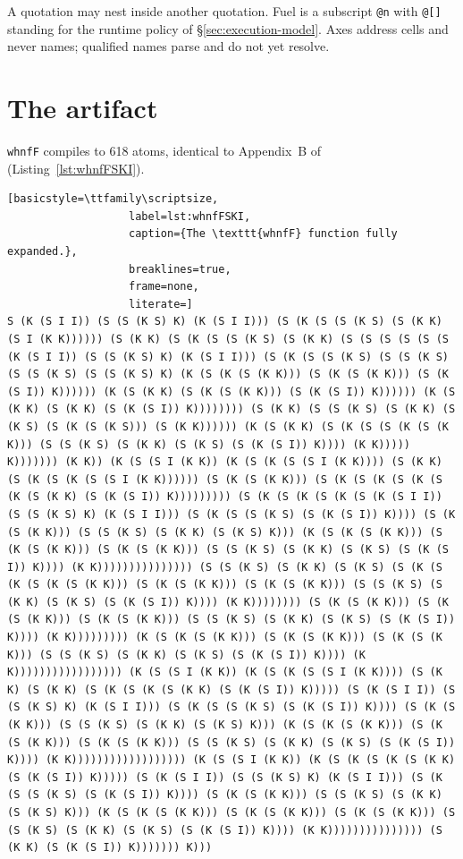 \documentclass[english,submission,code=tt]{programming}
\begin{document}
\newpage
A quotation may nest inside another quotation.  Fuel is a
subscript \texttt{@n} with \texttt{@[]} standing for the runtime policy 
of \S\ref{sec:execution-model}.  Axes address cells and never names;
qualified names parse and do not yet resolve.

\section{The artifact}\label{app:artifact}

\texttt{whnfF} compiles to 618 atoms, identical to 
Appendix~B of \citet{Davis2027} (Listing~\ref{lst:whnfFSKI}).

\begin{lstlisting}[basicstyle=\ttfamily\scriptsize,
                   label=lst:whnfFSKI,
                   caption={The \texttt{whnfF} function fully expanded.},
                   breaklines=true,
                   frame=none,
                   literate=]
S (K (S I I)) (S (S (K S) K) (K (S I I))) (S (K (S (S (K S) (S (K K) (S I (K K)))))) (S (K K) (S (K (S (S (K S) (S (K K) (S (S (S (S (S (S (K (S I I)) (S (S (K S) K) (K (S I I))) (S (K (S (S (K S) (S (S (K S) (S (S (K S) (S (S (K S) K) (K (S (K (S (K K))) (S (K (S (K K))) (S (K (S I)) K)))))) (K (S (K K) (S (K (S (K K))) (S (K (S I)) K)))))) (K (S (K K) (S (K K) (S (K (S I)) K)))))))) (S (K K) (S (S (K S) (S (K K) (S (K S) (S (K (S (K S))) (S (K K)))))) (K (S (K K) (S (K (S (S (K (S (K K))) (S (S (K S) (S (K K) (S (K S) (S (K (S I)) K)))) (K K))))) K))))))) (K K)) (K (S (S I (K K)) (K (S (K (S (S I (K K)))) (S (K K) (S (K (S (K (S (S I (K K)))))) (S (K (S (K K))) (S (K (S (K (S (K (S (K (S (K K) (S (K (S I)) K))))))))) (S (K (S (K (S (K (S (K (S I I)) (S (S (K S) K) (K (S I I))) (S (K (S (S (K S) (S (K (S I)) K)))) (S (K (S (K K))) (S (S (K S) (S (K K) (S (K S) K))) (K (S (K (S (K K))) (S (K (S (K K))) (S (K (S (K K))) (S (S (K S) (S (K K) (S (K S) (S (K (S I)) K)))) (K K))))))))))))))) (S (S (K S) (S (K K) (S (K S) (S (K (S (K (S (K (S (K K))) (S (K (S (K K))) (S (K (S (K K))) (S (S (K S) (S (K K) (S (K S) (S (K (S I)) K)))) (K K)))))))) (S (K (S (K K))) (S (K (S (K K))) (S (K (S (K K))) (S (S (K S) (S (K K) (S (K S) (S (K (S I)) K)))) (K K))))))))) (K (S (K (S (K K))) (S (K (S (K K))) (S (K (S (K K))) (S (S (K S) (S (K K) (S (K S) (S (K (S I)) K)))) (K K))))))))))))))))) (K (S (S I (K K)) (K (S (K (S (S I (K K)))) (S (K K) (S (K K) (S (K (S (K (S (K K) (S (K (S I)) K))))) (S (K (S I I)) (S (S (K S) K) (K (S I I))) (S (K (S (S (K S) (S (K (S I)) K)))) (S (K (S (K K))) (S (S (K S) (S (K K) (S (K S) K))) (K (S (K (S (K K))) (S (K (S (K K))) (S (K (S (K K))) (S (S (K S) (S (K K) (S (K S) (S (K (S I)) K)))) (K K)))))))))))))))))) (K (S (S I (K K)) (K (S (K (S (K (S (K K) (S (K (S I)) K))))) (S (K (S I I)) (S (S (K S) K) (K (S I I))) (S (K (S (S (K S) (S (K (S I)) K)))) (S (K (S (K K))) (S (S (K S) (S (K K) (S (K S) K))) (K (S (K (S (K K))) (S (K (S (K K))) (S (K (S (K K))) (S (S (K S) (S (K K) (S (K S) (S (K (S I)) K)))) (K K))))))))))))))) (S (K K) (S (K (S I)) K))))))) K)))
\end{lstlisting}
\end{document}

